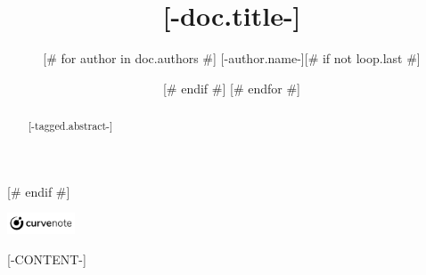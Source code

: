 \documentclass{article}
\title{[-doc.title-]}
\author{
[# for author in doc.authors #]
[-author.name-][# if not loop.last #] \and [# endif #]
[# endfor #]
}
\date{\displaydate{articleDate}}
[# if options.footnote_link #]
\newcommand{\logo}{
  \href{[-doc.oxalink-]}{\includegraphics[width=2cm]{curvenote.png}}
}
[# endif #]
\begin{document}
\begin{abstract}[-tagged.abstract-]\end{abstract}[# endif #]
\begin{center}\logo\end{center}
[-CONTENT-]

\end{document}
